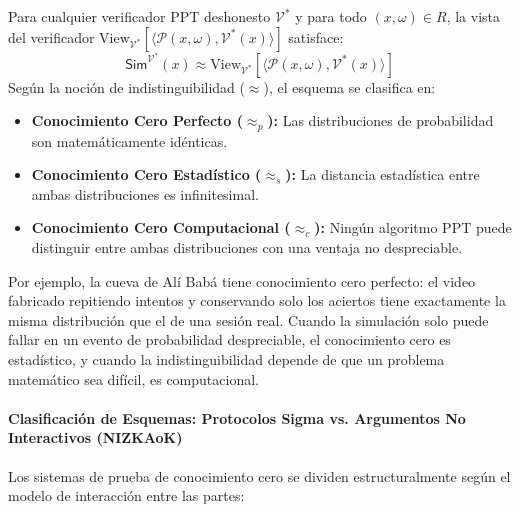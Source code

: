\begin{enumerate}
    Para cualquier verificador PPT deshonesto $\mathcal{V}^*$ y para todo $(x, \omega) \in R$, la vista del verificador $\text{View}_{\mathcal{V}^*}\left[ \langle \mathcal{P}(x, \omega), \mathcal{V}^*(x) \rangle \right]$ satisface:
    \begin{equation}
    \mathsf{Sim}^{\mathcal{V}^*}(x) \approx \text{View}_{\mathcal{V}^*}\left[ \langle \mathcal{P}(x, \omega), \mathcal{V}^*(x) \rangle \right]
    \end{equation}
    Según la noción de indistinguibilidad ($\approx$), el esquema se clasifica en:
    \begin{itemize}
        \item \textbf{Conocimiento Cero Perfecto ($\approx_p$):} Las distribuciones de probabilidad son matemáticamente idénticas.
        \item \textbf{Conocimiento Cero Estadístico ($\approx_s$):} La distancia estadística entre ambas distribuciones es infinitesimal.
        \item \textbf{Conocimiento Cero Computacional ($\approx_c$):} Ningún algoritmo PPT puede distinguir entre ambas distribuciones con una ventaja no despreciable.
    \end{itemize}
    Por ejemplo, la cueva de Alí Babá tiene conocimiento cero perfecto: el video fabricado repitiendo intentos y conservando solo los aciertos tiene exactamente la misma distribución que el de una sesión real. Cuando la simulación solo puede fallar en un evento de probabilidad despreciable, el conocimiento cero es estadístico, y cuando la indistinguibilidad depende de que un problema matemático sea difícil, es computacional.
\end{enumerate}

\paragraph{Clasificación de Esquemas: Protocolos Sigma vs. Argumentos No Interactivos (NIZKAoK)}
\label{sec:fiat-shamir}
Los sistemas de prueba de conocimiento cero se dividen estructuralmente según el modelo de interacción entre las partes:

